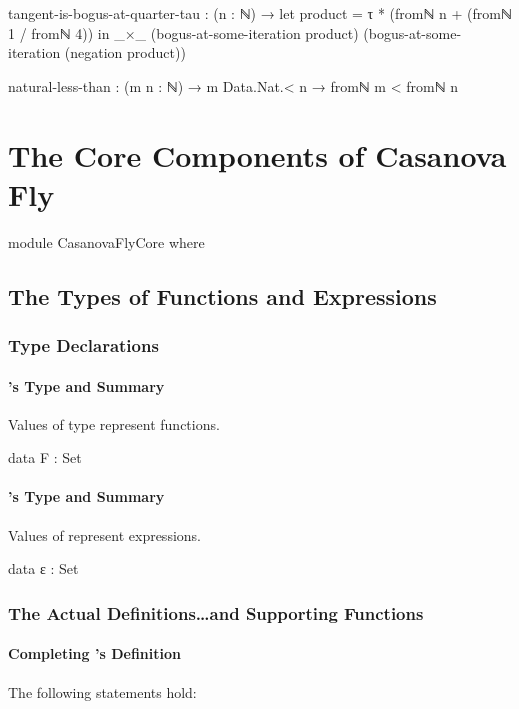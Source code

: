 \documentclass{report}
\begin{document}
\begin{code}
    tangent-is-bogus-at-quarter-tau :
      (n : ℕ) →
      let product = τ * (fromℕ n + (fromℕ 1 / fromℕ 4)) in
      _×_ (bogus-at-some-iteration product)
          (bogus-at-some-iteration (negation product))

    natural-less-than : (m n : ℕ) → m Data.Nat.< n → fromℕ m < fromℕ n
\end{code}

\part{The Core Components of Casanova Fly}

\begin{code}
module CasanovaFlyCore where
\end{code}

\chapter{The Types of Functions and Expressions}

\section{Type Declarations}

\subsection{'s Type and Summary}
Values of type  represent functions.

\begin{code}
  data F : Set
\end{code}

\subsection{'s Type and Summary}
Values of  represent expressions.

\begin{code}
  data ε : Set
\end{code}

\section{The Actual Definitions\ldots and Supporting Functions}

\subsection{Completing 's Definition}
The following statements hold:
\end{document}
